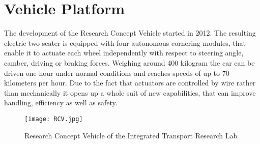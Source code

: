 \chapter{Vehicle Platform}
The development of the Research Concept Vehicle started in 2012. The resulting electric two-seater is equipped with four autonomous cornering modules, that enable it to actuate each wheel independently with respect to steering angle, camber, driving or braking forces. Weighing around 400 kilogram the car can be driven one hour under normal conditions and reaches speeds of up to 70 kilometers per hour. Due to the fact that actuators are controlled by wire rather than mechanically it opens up a whole suit of new capabilities, that can improve handling, efficiency as well as safety.


\begin{figure}[h]
\texttt{[image: RCV.jpg]}
\caption[Research Concept Vehicle of the ITRL]{Research Concept Vehicle of the Integrated Transport Research Lab}
\label{fig:RCV}
\end{figure}